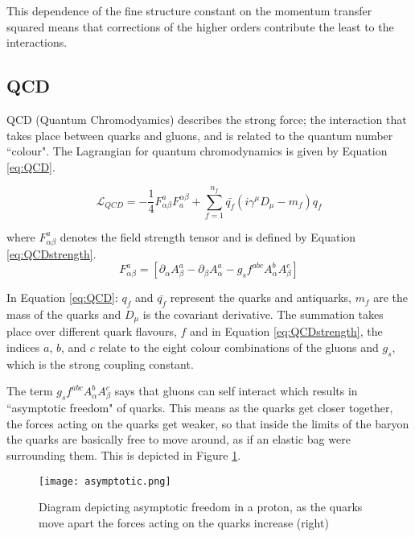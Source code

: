 \documentclass[11pt,oneside,a4paper]{article}
\begin{document}
This dependence of the fine structure constant on the momentum transfer squared means that corrections of the higher orders contribute the least to the interactions.

\subsection{QCD}

QCD (Quantum Chromodyamics) describes the strong force; the interaction that takes place between quarks and gluons, and is related to the quantum number ``colour".  The Lagrangian for quantum chromodynamics is given by Equation \ref{eq:QCD}. 

\begin{equation}
\label{eq:QCD}
\mathcal{L}_{QCD} = -\frac{1}{4}F^{a}_{\alpha\beta}F^{\alpha\beta}_{a} + \sum_{f=1}^{n_{f}}\bar{q_{f}}(i\gamma^{\mu} D_{\mu}- m_{f})q_{f}
\end{equation}

where $F^{a}_{\alpha\beta}$ denotes the field strength tensor and is defined by Equation \ref{eq:QCDstrength}.
\begin{equation}
\label{eq:QCDstrength}
F^{a}_{\alpha\beta} = [\partial_{\alpha}A^{a}_{\beta}-\partial_{\beta}A^{a}_{\alpha}-g_{s}f^{abc}A^{b}_{\alpha}A^{c}_{\beta}]
\end{equation}

In Equation \ref{eq:QCD}: $q_{f}$ and $\bar{q_{f}}$ represent the quarks and antiquarks, $m_{f}$ are the mass of the quarks and $D_{\mu}$ is the covariant derivative. The summation takes place over different quark flavours, $f$ and in Equation \ref{eq:QCDstrength}, the indices $a$, $b$, and $c$ relate to the eight colour combinations of the gluons and $g_{s}$, which is the strong coupling constant. 

The term $g_{s}f^{abc}A^{b}_{\alpha}A^{c}_{\beta}$ says that gluons can self interact which results in ``asymptotic freedom" of quarks. This means as the quarks get closer together, the forces acting on the quarks get weaker, so that inside the limits of the baryon the quarks are basically free to move around, as if an elastic bag were surrounding them. This is depicted in Figure \ref{fig:asymptotic}.

\begin{figure}[htbp]
	\centering
	\texttt{[image: asymptotic.png]}
	\caption{Diagram depicting asymptotic freedom in a proton, as the quarks move apart the forces acting on the quarks increase (right)}
	\label{fig:asymptotic}
\end{figure}
\end{document}

